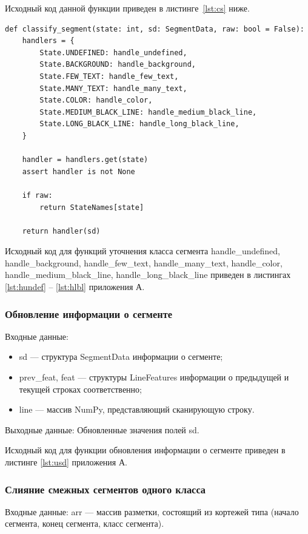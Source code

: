 Исходный код данной функции приведен в листинге~\ref{lst:cs} ниже.

\begin{lstlisting}[caption={Функция классификации сегмента}, label={lst:cs}]
def classify_segment(state: int, sd: SegmentData, raw: bool = False):
    handlers = {
        State.UNDEFINED: handle_undefined,
        State.BACKGROUND: handle_background,
        State.FEW_TEXT: handle_few_text,
        State.MANY_TEXT: handle_many_text,
        State.COLOR: handle_color,
        State.MEDIUM_BLACK_LINE: handle_medium_black_line,
        State.LONG_BLACK_LINE: handle_long_black_line,
    }

    handler = handlers.get(state)
    assert handler is not None

    if raw:
        return StateNames[state]

    return handler(sd)
\end{lstlisting}

Исходный код для функций уточнения класса сегмента handle\_undefined, handle\_background, handle\_few\_text, handle\_many\_text, handle\_color, handle\_medium\_black\_line, handle\_long\_black\_line приведен в листингах \ref{lst:hundef} -- \ref{lst:hlbl} приложения А.

\subsubsection{Обновление информации о сегменте} %
Входные данные:
\begin{itemize}
    \item sd --- структура SegmentData информации о сегменте;
    \item prev\_feat, feat --- структуры LineFeatures информации о предыдущей и текущей строках соответственно;
    \item line --- массив NumPy, представляющий сканирующую строку.
\end{itemize}

Выходные данные: Обновленные значения полей sd.

Исходный код для функции обновления информации о сегменте приведен в листинге \ref{lst:usd} приложения А.

\subsubsection{Слияние смежных сегментов одного класса} %
Входные данные: arr --- массив разметки, состоящий из кортежей типа (начало сегмента, конец сегмента, класс сегмента).

